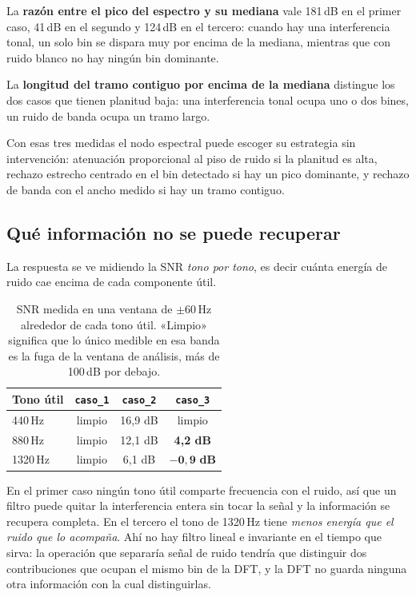 La \textbf{razón entre el pico del espectro y su mediana} vale 181\,dB en el
primer caso, 41\,dB en el segundo y 124\,dB en el tercero: cuando hay una
interferencia tonal, un solo bin se dispara muy por encima de la mediana,
mientras que con ruido blanco no hay ningún bin dominante.

La \textbf{longitud del tramo contiguo por encima de la mediana} distingue los
dos casos que tienen planitud baja: una interferencia tonal ocupa uno o dos
bines, un ruido de banda ocupa un tramo largo.

Con esas tres medidas el nodo espectral puede escoger su estrategia sin
intervención: atenuación proporcional al piso de ruido si la planitud es alta,
rechazo estrecho centrado en el bin detectado si hay un pico dominante, y
rechazo de banda con el ancho medido si hay un tramo contiguo.

\subsection{Qué información no se puede recuperar}
\label{sec:limite}

La respuesta se ve midiendo la SNR \emph{tono por tono}, es decir cuánta energía
de ruido cae encima de cada componente útil.

\begin{table}[H]
\centering\small
\caption{SNR medida en una ventana de $\pm 60$\,Hz alrededor de cada tono útil.
«Limpio» significa que lo único medible en esa banda es la fuga de la ventana de
análisis, más de 100\,dB por debajo.}
\begin{tabular}{lccc}
\toprule
Tono útil & \texttt{caso\_1} & \texttt{caso\_2} & \texttt{caso\_3} \\
\midrule
440\,Hz  & limpio & 16,9 dB & limpio \\
880\,Hz  & limpio & 12,1 dB & \textbf{4,2 dB} \\
1320\,Hz & limpio & 6,1 dB  & $\mathbf{-0{,}9}$ \textbf{dB} \\
\bottomrule
\end{tabular}
\end{table}

En el primer caso ningún tono útil comparte frecuencia con el ruido, así que un
filtro puede quitar la interferencia entera sin tocar la señal y la información
se recupera completa. En el tercero el tono de 1320\,Hz tiene \emph{menos
energía que el ruido que lo acompaña}. Ahí no hay filtro lineal e invariante en
el tiempo que sirva: la operación que separaría señal de ruido tendría que
distinguir dos contribuciones que ocupan el mismo bin de la DFT, y la DFT no
guarda ninguna otra información con la cual distinguirlas.

